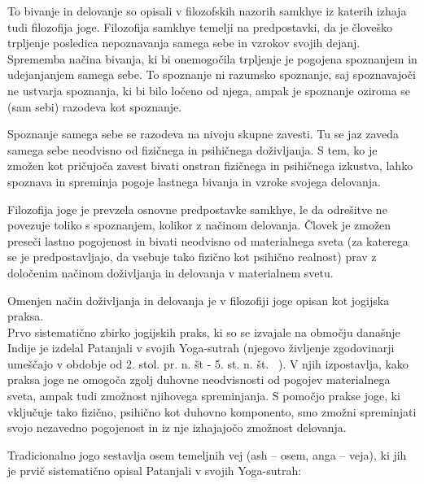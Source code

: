 \documentclass[a4paper, 12pt]{book}
\begin{document}
To bivanje in delovanje so opisali v filozofskih nazorih samkhye iz katerih izhaja tudi filozofija joge. Filozofija samkhye temelji na predpostavki, da je človeško trpljenje posledica nepoznavanja samega sebe in vzrokov svojih dejanj. Sprememba načina bivanja, ki bi onemogočila trpljenje je pogojena spoznanjem in udejanjanjem samega sebe. To spoznanje ni razumsko spoznanje, saj spoznavajoči ne ustvarja spoznanja, ki bi bilo ločeno od njega, ampak je spoznanje oziroma se (sam sebi) razodeva kot spoznanje.

Spoznanje samega sebe se razodeva na nivoju skupne zavesti. Tu se jaz zaveda samega sebe neodvisno od fizičnega in psihičnega doživljanja. S tem, ko je zmožen kot pričujoča zavest bivati onstran fizičnega in psihičnega izkustva, lahko spoznava in spreminja pogoje lastnega bivanja in vzroke svojega delovanja.

Filozofija joge je prevzela osnovne predpostavke samkhye, le da odrešitve ne povezuje toliko s spoznanjem, kolikor z načinom delovanja. Človek je zmožen preseči lastno pogojenost in bivati neodvisno od materialnega sveta (za katerega se je predpostavljajo, da vsebuje tako fizično kot psihično realnost) prav z določenim načinom doživljanja in delovanja v materialnem svetu.

Omenjen način doživljanja in delovanja je v filozofiji joge opisan kot jogijska praksa. \\ 
Prvo sistematično zbirko jogijskih praks, ki so se izvajale na območju današnje Indije je izdelal Patanjali v svojih Yoga-sutrah (njegovo življenje zgodovinarji umeščajo v obdobje od 2. stol. pr. n. št - 5. st. n. št. ~\cite{ZgodovinaJoge}). V njih izpostavlja, kako praksa joge ne omogoča zgolj duhovne neodvisnosti od pogojev materialnega sveta, ampak tudi zmožnost njihovega spreminjanja. S pomočjo prakse joge, ki vključuje tako fizično, psihično kot duhovno komponento, smo zmožni spreminjati svojo nezavedno pogojenost in iz nje izhajajočo zmožnost delovanja.

Tradicionalno jogo sestavlja osem temeljnih vej (ash – osem, anga – veja), ki jih je prvič sistematično opisal Patanjali v svojih Yoga-sutrah:
\end{document}
